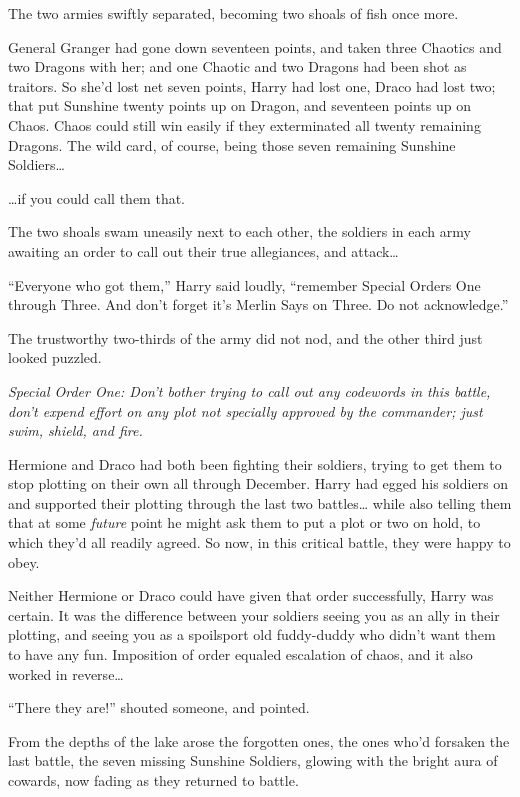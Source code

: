The two armies swiftly separated, becoming two shoals of fish once more.

General Granger had gone down seventeen points, and taken three Chaotics
and two Dragons with her; and one Chaotic and two Dragons had been shot
as traitors. So she'd lost net seven points, Harry had lost one, Draco
had lost two; that put Sunshine twenty points up on Dragon, and
seventeen points up on Chaos. Chaos could still win easily if they
exterminated all twenty remaining Dragons. The wild card, of course,
being those seven remaining Sunshine Soldiers\ldots{}

\ldots{}if you could call them that.

The two shoals swam uneasily next to each other, the soldiers in each
army awaiting an order to call out their true allegiances, and
attack\ldots{}

``Everyone who got them,'' Harry said loudly, ``remember Special Orders
One through Three. And don't forget it's Merlin Says on Three. Do not
acknowledge.''

The trustworthy two-thirds of the army did not nod, and the other third
just looked puzzled.

\emph{Special Order One: Don't bother trying to call out any codewords
in this battle, don't expend effort on any plot not specially approved
by the commander; just swim, shield, and fire.}

Hermione and Draco had both been fighting their soldiers, trying to get
them to stop plotting on their own all through December. Harry had egged
his soldiers on and supported their plotting through the last two
battles\ldots{} while also telling them that at some \emph{future} point
he might ask them to put a plot or two on hold, to which they'd all
readily agreed. So now, in this critical battle, they were happy to
obey.

Neither Hermione or Draco could have given that order successfully,
Harry was certain. It was the difference between your soldiers seeing
you as an ally in their plotting, and seeing you as a spoilsport old
fuddy-duddy who didn't want them to have any fun. Imposition of order
equaled escalation of chaos, and it also worked in reverse\ldots{}

``There they are!'' shouted someone, and pointed.

From the depths of the lake arose the forgotten ones, the ones who'd
forsaken the last battle, the seven missing Sunshine Soldiers, glowing
with the bright aura of cowards, now fading as they returned to battle.

